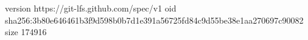 version https://git-lfs.github.com/spec/v1
oid sha256:3b80e646461b3f9d598b0b7d1e391a56725fd84c9d55be38e1aa270697c90082
size 174916
